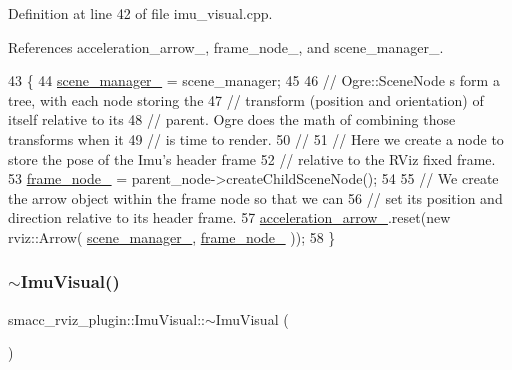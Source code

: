 Definition at line 42 of file imu\+\_\+visual.\+cpp.



References acceleration\+\_\+arrow\+\_\+, frame\+\_\+node\+\_\+, and scene\+\_\+manager\+\_\+.


\begin{DoxyCode}
43 \{
44   \hyperlink{classsmacc__rviz__plugin_1_1ImuVisual_acef4dba58d14224192bbed7eabbd6cbb}{scene\_manager\_} = scene\_manager;
45 
46   \textcolor{comment}{// Ogre::SceneNode s form a tree, with each node storing the}
47   \textcolor{comment}{// transform (position and orientation) of itself relative to its}
48   \textcolor{comment}{// parent.  Ogre does the math of combining those transforms when it}
49   \textcolor{comment}{// is time to render.}
50   \textcolor{comment}{//}
51   \textcolor{comment}{// Here we create a node to store the pose of the Imu's header frame}
52   \textcolor{comment}{// relative to the RViz fixed frame.}
53   \hyperlink{classsmacc__rviz__plugin_1_1ImuVisual_ae41316c00ac89e1e0ee0adf62da10841}{frame\_node\_} = parent\_node->createChildSceneNode();
54 
55   \textcolor{comment}{// We create the arrow object within the frame node so that we can}
56   \textcolor{comment}{// set its position and direction relative to its header frame.}
57   \hyperlink{classsmacc__rviz__plugin_1_1ImuVisual_abead7d3f3c66b20bba8123a145b121b0}{acceleration\_arrow\_}.reset(\textcolor{keyword}{new} rviz::Arrow( \hyperlink{classsmacc__rviz__plugin_1_1ImuVisual_acef4dba58d14224192bbed7eabbd6cbb}{scene\_manager\_}, 
      \hyperlink{classsmacc__rviz__plugin_1_1ImuVisual_ae41316c00ac89e1e0ee0adf62da10841}{frame\_node\_} ));
58 \}
\end{DoxyCode}
\mbox{\label{classsmacc__rviz__plugin_1_1ImuVisual_acabcd6898e61f77c5353205539457db1}} 
\subsubsection{\texorpdfstring{$\sim$\+Imu\+Visual()}{~ImuVisual()}}
{\footnotesize\ttfamily smacc\+\_\+rviz\+\_\+plugin\+::\+Imu\+Visual\+::$\sim$\+Imu\+Visual (\begin{DoxyParamCaption}{ }\end{DoxyParamCaption})\hspace{0.3cm}{\ttfamily [virtual]}}



